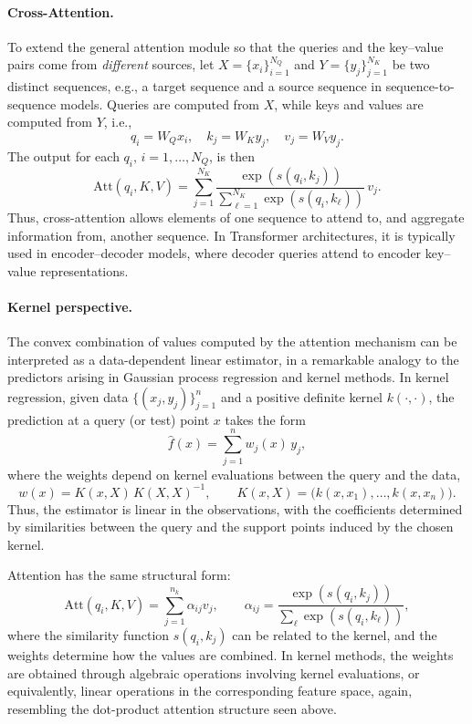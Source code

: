 \paragraph{Cross-Attention.} To extend the general attention module so that the queries and the key–value pairs come from \emph{different} sources, let $X = \{x_i\}_{i=1}^{N_Q}$ and $Y = \{y_j\}_{j=1}^{N_K}$ be two distinct sequences, e.g., a target sequence and a source sequence in sequence-to-sequence models. Queries are computed from $X$, while keys and values are computed from $Y$, i.e., 
\[
q_i = W_Q x_i, 
\quad
k_j = W_K y_j, 
\quad
v_j = W_V y_j.
\]
The output for each $q_i,\,i=1,\ldots,N_Q$, is then
\[
\mathrm{Att}(q_i, K, V)
=
\sum_{j=1}^{N_K}
\frac{\exp\!\left(s(q_i,k_j)\right)}
{\sum_{\ell=1}^{N_K} \exp\!\left(s(q_i,k_\ell)\right)}
\, v_j.
\]
Thus, cross-attention allows elements of one sequence to attend to, and aggregate information from, another sequence. In Transformer architectures, it is typically used in encoder–decoder models, where decoder queries attend to encoder key–value representations.


\paragraph{Kernel perspective.} The convex combination of values computed by the attention mechanism can be interpreted as a data-dependent linear estimator, in a remarkable analogy to the predictors arising in Gaussian process regression and kernel methods. In kernel regression, given data $\{(x_j,y_j)\}_{j=1}^n$ and a positive definite kernel $k(\cdot,\cdot)$,
the prediction at a query (or test) point $x$ takes the form
\[
\hat f(x)
=
\sum_{j=1}^n w_j(x)\, y_j,
\]
where the weights depend on kernel evaluations between the query and the data,
\[
w(x)
=
K(x,X)\, K(X,X)^{-1},
\qquad
K(x,X) = \big(k(x,x_1),\dots,k(x,x_n)\big).
\]
Thus, the estimator is linear in the observations, with the coefficients determined by similarities between the query and the support points induced by the chosen kernel.

Attention has the same structural form:
\[
\mathrm{Att}(q_i,K,V)
=
\sum_{j=1}^{n_k} \alpha_{ij} v_j,
\qquad
\alpha_{ij}
=
\frac{\exp(s(q_i,k_j))}
{\sum_{\ell} \exp(s(q_i,k_\ell))},
\]
where the similarity function $s(q_i,k_j)$ can be related to the kernel, and the weights determine how the values are
combined. In kernel methods, the weights are obtained through algebraic operations involving kernel evaluations, or equivalently, linear operations in the corresponding feature space, again, resembling the dot-product attention structure seen above. 

